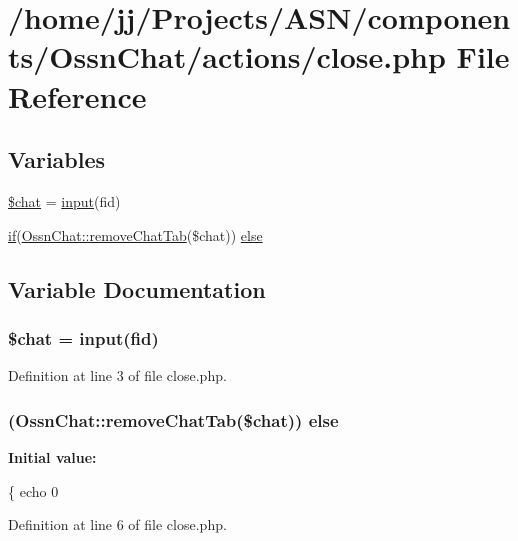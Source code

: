 \hypertarget{close_8php}{}\section{/home/jj/\+Projects/\+A\+S\+N/components/\+Ossn\+Chat/actions/close.php File Reference}
\label{close_8php}
\subsection*{Variables}
\begin{DoxyCompactItemize}
\item 
\hyperlink{close_8php_a0504883d777f5418f80e28e587901860}{\$chat} = \hyperlink{ossn_8lib_8input_8php_a64ebee98b041c4f75f71ed3cd73cc8ed}{input}(\textquotesingle{}fid\textquotesingle{})
\item 
\hyperlink{jquery_8tokeninput_8js_ad8dd46a3cbc004569e34401e9e71771a}{if}(\hyperlink{class_ossn_chat_adebcbd6e03a2d2b4d2f023e16a634da2}{Ossn\+Chat\+::remove\+Chat\+Tab}(\$chat)) \hyperlink{close_8php_a270bcbaf117b7d1ae4bd44ab76f80879}{else}
\end{DoxyCompactItemize}


\subsection{Variable Documentation}
\subsubsection[{\texorpdfstring{\$chat}{$chat}}]{\setlength{\rightskip}{0pt plus 5cm}\$chat = {\bf input}(\textquotesingle{}fid\textquotesingle{})}\hypertarget{close_8php_a0504883d777f5418f80e28e587901860}{}\label{close_8php_a0504883d777f5418f80e28e587901860}


Definition at line 3 of file close.\+php.

\subsubsection[{\texorpdfstring{else}{else}}]{ ({\bf Ossn\+Chat\+::remove\+Chat\+Tab}(\$chat)) else}\hypertarget{close_8php_a270bcbaf117b7d1ae4bd44ab76f80879}{}\label{close_8php_a270bcbaf117b7d1ae4bd44ab76f80879}
{\bfseries Initial value\+:}
\begin{DoxyCode}
\{
    echo 0
\end{DoxyCode}


Definition at line 6 of file close.\+php.

